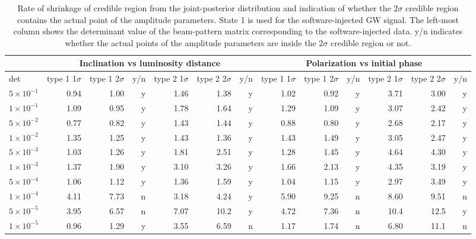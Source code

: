 \documentclass[%
 aps,
 prd,
 amsmath,amssymb,
 reprint,%
superscriptaddress
]{revtex4-1}
\begin{document}
\begin{table*}[htb]
   \begin{tabular}{|l||r|r|r||r|r|r||r|r|r||r|r|r|} \hline
    \multicolumn{1}{|l||}{} & \multicolumn{6}{c||}{Inclination vs luminosity distance} & \multicolumn{6}{c|}{Polarization vs initial phase}\\ \hline
    det & type 1 1$\sigma$ & type 1 2$\sigma$ &y/n &type 2 1$\sigma$ & type 2 2$\sigma$ &y/n &type 1 1$\sigma$ & type 1 2$\sigma$ &y/n & type 2 1$\sigma$ &type 2 2$\sigma$&y/n \\ \hline \hline
   $5\times10^{-1}$ & 0.94 & 1.00 &y &1.46 & 1.38 &y &1.02 & 0.92&y & 3.71 & 3.00&y \\ \hline
   $1\times10^{-1}$ & 1.09 & 0.95 &y &1.78 & 1.64 &y &1.29 & 1.09&y & 3.07 & 2.42&y \\ \hline
   $5\times10^{-2}$ & 0.77 & 0.82 &y &1.43 & 1.44 &y &0.88 & 0.80&y & 2.68 & 2.17&y \\ \hline
   $1\times10^{-2}$ & 1.35 & 1.25 &y &1.43 & 1.36 &y &1.43 & 1.49&y & 3.05 & 2.47&y \\ \hline
   $5\times10^{-3}$ & 1.03 & 1.26 &y &1.81 & 2.51 &y &1.28 & 1.45&y & 4.64 & 4.30&y \\ \hline
   $1\times10^{-3}$ & 1.37 & 1.90 &y &3.10 & 3.26 &y &1.66 & 2.13&y & 4.35 & 3.19&y \\ \hline
   $5\times10^{-4}$ & 1.06 & 1.12 &y &1.36 & 1.59 &y &1.04 & 1.15&y & 2.97 & 3.49&y \\ \hline
   $1\times10^{-4}$ & 4.11 & 7.73 &n &3.18 & 4.24 &y &5.90 & 9.25&n & 8.60 & 9.51&n \\ \hline
   $5\times10^{-5}$ & 3.95 & 6.57 &n &7.07 & 10.2 &y &4.72 & 7.36&n & 10.4 & 12.5&y \\ \hline
   $1\times10^{-5}$ & 0.96 & 1.29 &y &3.55 & 6.59 &n &1.17 & 1.74&n & 6.80 & 11.1&n \\ \hline
   \end{tabular}
 \caption{Rate of shrinkage of credible region from the joint-posterior distribution and indication of whether the $2\sigma$ credible region contains the actual point of the amplitude parameters. State 1 is used for the software-injected GW signal. The left-most column shows the determinant value of the beam-pattern matrix corresponding to the software-injected data. y/n indicates whether the actual points of the amplitude parameters are inside the $2\sigma$ credible region or not.\label{ken-short_thesis-tab:4}}
\end{table*}
\end{document}
